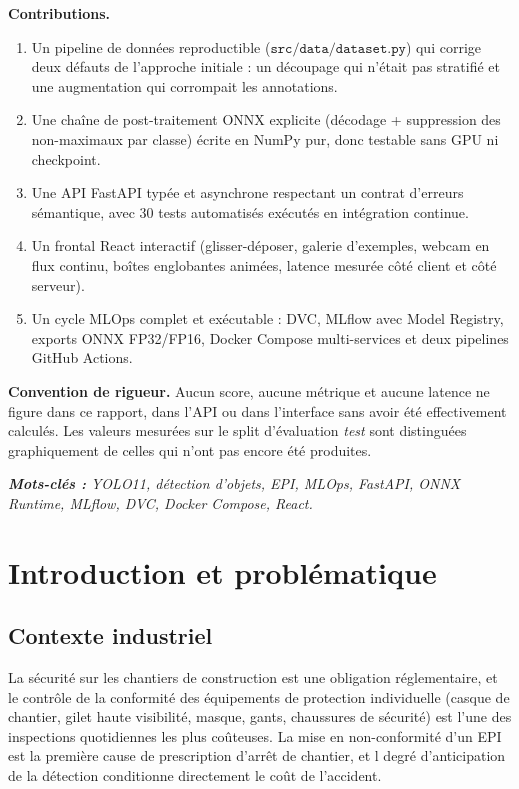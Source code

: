 \documentclass[11pt,a4paper]{article}
\newenvironment{keyword}
  {\par\vspace{0.4em}\noindent\begin{minipage}{\linewidth}\small\itshape}
  {\end{minipage}\par\vspace{0.4em}}
\begin{document}
\textbf{Contributions.}
\begin{enumerate}[leftmargin=1.4em]
  \item Un pipeline de données reproductible ($\texttt{src/data/dataset.py}$) qui
        corrige deux défauts de l'approche initiale : un découpage qui n'était
        pas stratifié et une augmentation qui corrompait les annotations.
  \item Une chaîne de post-traitement ONNX explicite (décodage + suppression
        des non-maximaux par classe) écrite en NumPy pur, donc testable sans
        GPU ni checkpoint.
  \item Une API FastAPI typée et asynchrone respectant un contrat d'erreurs
        sémantique, avec 30 tests automatisés exécutés en intégration continue.
  \item Un frontal React interactif (glisser-déposer, galerie d'exemples,
        webcam en flux continu, boîtes englobantes animées, latence mesurée
        côté client et côté serveur).
  \item Un cycle MLOps complet et exécutable : DVC, MLflow avec Model
        Registry, exports ONNX FP32/FP16, Docker Compose multi-services et
        deux pipelines GitHub Actions.
\end{enumerate}

\textbf{Convention de rigueur.} Aucun score, aucune métrique et aucune
latence ne figure dans ce rapport, dans l'API ou dans l'interface sans
avoir été effectivement calculés. Les valeurs mesurées sur le split
d'évaluation \emph{test} sont distinguées graphiquement de celles qui
n'ont pas encore été produites.

\begin{keyword}
\textbf{Mots-clés :} YOLO11, détection d'objets, EPI, MLOps, FastAPI,
ONNX Runtime, MLflow, DVC, Docker Compose, React.
\end{keyword}

\newpage

\section{Introduction et problématique}

\subsection{Contexte industriel}

La sécurité sur les chantiers de construction est une obligation
réglementaire, et le contrôle de la conformité des équipements de
protection individuelle (casque de chantier, gilet haute visibilité,
masque, gants, chaussures de sécurité) est l'une des inspections
quotidiennes les plus coûteuses. La mise en non-conformité d'un EPI est
la première cause de prescription d'arrêt de chantier, et l degré
d'anticipation de la détection conditionne directement le coût de
l'accident.
\end{document}
